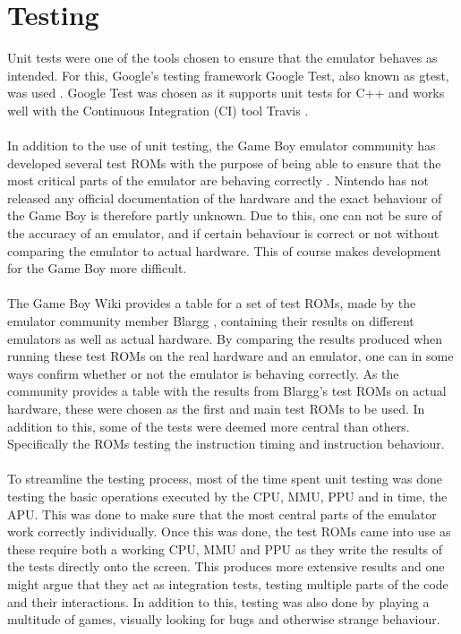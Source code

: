 \section{Testing}
Unit tests were one of the tools chosen to ensure that the emulator behaves as intended. For this, Google's testing framework Google Test, also known as gtest, was used \cite{gtest}. Google Test was chosen as it supports unit tests for C++ and works well with the Continuous Integration (CI) tool Travis \cite{Travis}.
\\\\
In addition to the use of unit testing, the Game Boy emulator community has developed several test ROMs with the purpose of being able to ensure that the most critical parts of the emulator are behaving correctly \cite{Blargg}. Nintendo has not released any official documentation of the hardware and the exact behaviour of the Game Boy is therefore partly unknown. Due to this, one can not be sure of the accuracy of an emulator, and if certain behaviour is correct or not without comparing the emulator to actual hardware. This of course makes development for the Game Boy more difficult.
\\\\
The Game Boy Wiki provides a table for a set of test ROMs, made by the emulator community member Blargg \cite{Blargg} \cite{TestROMsResult}, containing their results on different emulators as well as actual hardware.
By comparing the results produced when running these test ROMs on the real hardware and an emulator, one can in some ways confirm whether or not the emulator is behaving correctly. As the community provides a table with the results from Blargg's test ROMs on actual hardware, these were chosen as the first and main test ROMs to be used. In addition to this, some of the tests were deemed more central than others. Specifically the ROMs testing the instruction timing and instruction behaviour.
\\\\
To streamline the testing process, most of the time spent unit testing was done testing the basic operations executed by the CPU, MMU, PPU and in time, the APU. This was done to make sure that the most central parts of the emulator work correctly individually. Once this was done, the test ROMs came into use as these require both a working CPU, MMU and PPU as they write the results of the tests directly onto the screen. This produces more extensive results and one might argue that they act as integration tests, testing multiple parts of the code and their interactions. In addition to this, testing was also done by playing a multitude of games, visually looking for bugs and otherwise strange behaviour.
